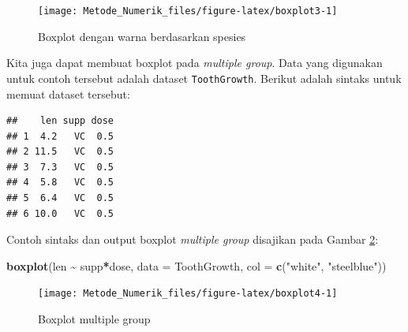 \documentclass[
]{book}
\newenvironment{Shaded}{\begin{snugshade}}{\end{snugshade}}
\newcommand{\AttributeTok}[1]{\textcolor[rgb]{0.13,0.29,0.53}{#1}}
\newcommand{\CommentTok}[1]{\textcolor[rgb]{0.56,0.35,0.01}{\textit{#1}}}
\newcommand{\FunctionTok}[1]{\textcolor[rgb]{0.13,0.29,0.53}{\textbf{#1}}}
\newcommand{\NormalTok}[1]{#1}
\newcommand{\OtherTok}[1]{\textcolor[rgb]{0.56,0.35,0.01}{#1}}
\newcommand{\SpecialCharTok}[1]{\textcolor[rgb]{0.81,0.36,0.00}{\textbf{#1}}}
\newcommand{\StringTok}[1]{\textcolor[rgb]{0.31,0.60,0.02}{#1}}
\theoremstyle{definition}
\theoremstyle{definition}
\theoremstyle{definition}
\theoremstyle{definition}
\theoremstyle{remark}
\begin{document}
\begin{figure}

{\centering \texttt{[image: Metode\_Numerik\_files/figure-latex/boxplot3-1]} 

}

\caption{Boxplot dengan warna berdasarkan spesies}\label{fig:boxplot3}
\end{figure}

Kita juga dapat membuat boxplot pada \emph{multiple group}. Data yang digunakan untuk contoh tersebut adalah dataset \texttt{ToothGrowth}. Berikut adalah sintaks untuk memuat dataset tersebut:

\begin{Shaded}
\end{Shaded}

\begin{verbatim}
##    len supp dose
## 1  4.2   VC  0.5
## 2 11.5   VC  0.5
## 3  7.3   VC  0.5
## 4  5.8   VC  0.5
## 5  6.4   VC  0.5
## 6 10.0   VC  0.5
\end{verbatim}

Contoh sintaks dan output boxplot \emph{multiple group} disajikan pada Gambar \ref{fig:boxplot4}:

\begin{Shaded}
\begin{Highlighting}[]
\FunctionTok{boxplot}\NormalTok{(len }\SpecialCharTok{\textasciitilde{}}\NormalTok{ supp}\SpecialCharTok{*}\NormalTok{dose, }\AttributeTok{data =}\NormalTok{ ToothGrowth,}
        \AttributeTok{col =} \FunctionTok{c}\NormalTok{(}\StringTok{"white"}\NormalTok{, }\StringTok{"steelblue"}\NormalTok{))}
\end{Highlighting}
\end{Shaded}

\begin{figure}

{\centering \texttt{[image: Metode\_Numerik\_files/figure-latex/boxplot4-1]} 

}

\caption{Boxplot multiple group}\label{fig:boxplot4}
\end{figure}
\end{document}

